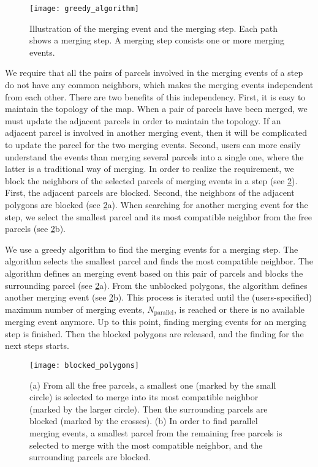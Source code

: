 \documentclass[ijgi,article,submit,moreauthors,pdftex]{Definitions/mdpi}
\begin{document}
\begin{figure}[tb]
\centering
\texttt{[image: greedy\_algorithm]}
\caption{Illustration of the merging event and the merging step. 
Each path shows a merging step. 
A merging step consists one or more merging events.}
\label{fig:event_and_step}
\end{figure}


We require that 
all the pairs of parcels involved in the merging events of a step 
do not have any common neighbors, 
which makes the merging events independent from each other.
There are two benefits of this independency.
First, it is easy to maintain the topology of the map.
When a pair of parcels have been merged, 
we must update the adjacent parcels in order to maintain the topology.
If an adjacent parcel is involved in another merging event,
then it will be complicated to update the parcel for the two merging events.
Second, users can more easily understand the events 
than merging several parcels into a single one,
where the latter is a traditional way of merging.
In order to realize the requirement, 
we block the neighbors of the selected parcels of merging events in a step
(see \fig\ref{fig:blocked_polygons}).
First, the adjacent parcels are blocked.
Second, the neighbors
of the adjacent polygons are blocked (see \fig\ref{fig:blocked_polygons}a).
When searching for another merging event for the step, 
we select the smallest parcel and its most compatible neighbor
from the free parcels (see \fig\ref{fig:blocked_polygons}b).

We use a greedy algorithm to find the merging events for a merging step.
The algorithm selects the smallest parcel and 
finds the most compatible neighbor.
The algorithm defines an merging event based on this pair of parcels 
and blocks the surrounding parcel (see \fig\ref{fig:blocked_polygons}a).
From the unblocked polygons, the algorithm defines another merging event
(see \fig\ref{fig:blocked_polygons}b).
This process is iterated 
until the (users-specified) maximum number of merging events, 
$N_\mathrm{parallel}$, is reached or 
there is no available merging event anymore.
Up to this point, finding merging events for an merging step is finished.
Then the blocked polygons are released, 
and the finding for the next steps starts.


\begin{figure}[tb]
\centering
\texttt{[image: blocked\_polygons]}
\caption{(a) From all the free parcels,
a smallest one (marked by the small circle) is selected to merge into
its most compatible neighbor (marked by the larger circle).
Then the surrounding parcels are blocked (marked by the crosses).
(b) In order to find parallel merging events, 
a smallest parcel from the remaining free parcels
is selected to merge with the most compatible neighbor,
and the surrounding parcels are blocked.
}
\label{fig:blocked_polygons}
\end{figure}
\end{document}
